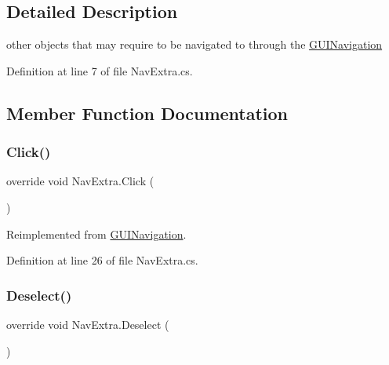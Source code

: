 \subsection{Detailed Description}
other objects that may require to be navigated to through the \mbox{\hyperlink{class_g_u_i_navigation}{G\+U\+I\+Navigation}} 



Definition at line 7 of file Nav\+Extra.\+cs.



\subsection{Member Function Documentation}
\mbox{\label{class_nav_extra_aa4325eb5cc7289d582ffda1a617dd093}} 
\subsubsection{\texorpdfstring{Click()}{Click()}}
{\footnotesize\ttfamily override void Nav\+Extra.\+Click (\begin{DoxyParamCaption}{ }\end{DoxyParamCaption})\hspace{0.3cm}{\ttfamily [virtual]}}



Reimplemented from \mbox{\hyperlink{class_g_u_i_navigation_a175178a8bf2832e74c13f83bf8e8f714}{G\+U\+I\+Navigation}}.



Definition at line 26 of file Nav\+Extra.\+cs.

\mbox{\label{class_nav_extra_a31e644667449d9080e324212724ac29d}} 
\subsubsection{\texorpdfstring{Deselect()}{Deselect()}}
{\footnotesize\ttfamily override void Nav\+Extra.\+Deselect (\begin{DoxyParamCaption}{ }\end{DoxyParamCaption})\hspace{0.3cm}{\ttfamily [virtual]}}



